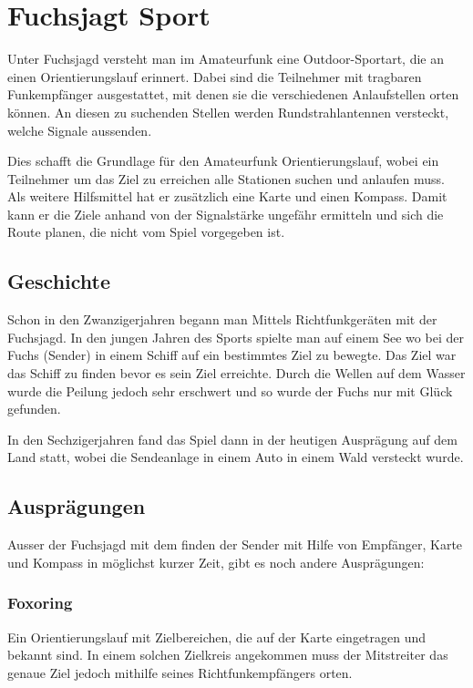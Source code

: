 
\newpage
\section{Fuchsjagt Sport} %
\label{sec:Fuchsjagt Sport}

Unter Fuchsjagd versteht man im Amateurfunk eine Outdoor-Sportart, die an einen Orientierungslauf erinnert. Dabei sind die Teilnehmer mit tragbaren Funkempfänger ausgestattet, mit denen sie die verschiedenen Anlaufstellen orten können. An diesen zu suchenden Stellen werden Rundstrahlantennen versteckt, welche Signale aussenden.

Dies schafft die Grundlage für den Amateurfunk Orientierungslauf, wobei ein Teilnehmer um das Ziel zu erreichen alle Stationen suchen und anlaufen muss. Als weitere Hilfsmittel hat er zusätzlich eine Karte und einen Kompass. Damit kann er die Ziele anhand von der Signalstärke ungefähr ermitteln und sich die Route planen, die nicht vom Spiel vorgegeben ist. 

\subsection{Geschichte} %
\label{sub:Geschichte}

Schon in den Zwanzigerjahren begann man Mittels Richtfunkgeräten mit der Fuchsjagd. In den jungen Jahren des Sports spielte man auf einem See wo bei der Fuchs (Sender) in einem Schiff auf ein bestimmtes Ziel zu bewegte. Das Ziel war das Schiff zu finden bevor es sein Ziel erreichte. Durch die Wellen auf dem Wasser wurde die Peilung jedoch sehr erschwert und so wurde der Fuchs nur mit Glück gefunden.

In den Sechzigerjahren fand das Spiel dann in der heutigen Ausprägung auf dem Land statt, wobei die Sendeanlage in einem Auto in einem Wald versteckt wurde. 

\subsection{Ausprägungen} %
\label{sub:Ausprägungen}

Ausser der Fuchsjagd mit dem finden der Sender mit Hilfe von Empfänger, Karte und Kompass in möglichst kurzer Zeit, gibt es noch andere Ausprägungen:

\subsubsection{Foxoring} %
\label{ssub:Foxoring}
Ein Orientierungslauf mit Zielbereichen, die auf der Karte eingetragen und bekannt sind. In einem solchen Zielkreis angekommen muss der Mitstreiter das genaue Ziel jedoch mithilfe seines Richtfunkempfängers orten.


